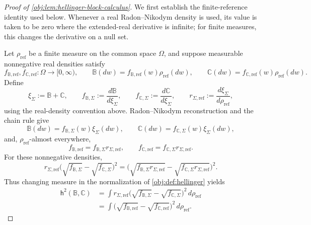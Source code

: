 \documentclass[11pt]{article}
\begin{document}
\begin{proof}[Proof of \cref{obj:lem:hellinger-block-calculus}]
We first establish the finite-reference identity used below. Whenever a real Radon--Nikodym density is used, its value is taken to be zero where the extended-real derivative is infinite; for finite measures, this changes the derivative on a null set.

Let \(\rho_{\mathrm{ref}}\) be a finite measure on the common space \(\Omega\), and suppose measurable nonnegative real densities satisfy
\[
f_{\mathbb B,\mathrm{ref}},f_{\mathbb C,\mathrm{ref}}
   :\Omega\longrightarrow[0,\infty),
\qquad
\mathbb B(dw)=f_{\mathbb B,\mathrm{ref}}(w)\rho_{\mathrm{ref}}(dw),
\qquad
\mathbb C(dw)=f_{\mathbb C,\mathrm{ref}}(w)\rho_{\mathrm{ref}}(dw).
\]
Define
\[
\xi_{\Sigma}:=\mathbb B+\mathbb C,
\qquad
f_{\mathbb B,\Sigma}:=\frac{d\mathbb B}{d\xi_{\Sigma}},
\qquad
f_{\mathbb C,\Sigma}:=\frac{d\mathbb C}{d\xi_{\Sigma}},
\qquad
r_{\Sigma,\mathrm{ref}}:=\frac{d\xi_{\Sigma}}{d\rho_{\mathrm{ref}}},
\]
using the real-density convention above. Radon--Nikodym reconstruction and the chain rule give
\[
\mathbb B(dw)=f_{\mathbb B,\Sigma}(w)\xi_{\Sigma}(dw),
\qquad
\mathbb C(dw)=f_{\mathbb C,\Sigma}(w)\xi_{\Sigma}(dw),
\]
and, \(\rho_{\mathrm{ref}}\)-almost everywhere,
\[
f_{\mathbb B,\mathrm{ref}}
   =f_{\mathbb B,\Sigma}r_{\Sigma,\mathrm{ref}},
\qquad
f_{\mathbb C,\mathrm{ref}}
   =f_{\mathbb C,\Sigma}r_{\Sigma,\mathrm{ref}}.
\]
For these nonnegative densities,
\[
r_{\Sigma,\mathrm{ref}}
 \bigl(\sqrt{f_{\mathbb B,\Sigma}}
             -\sqrt{f_{\mathbb C,\Sigma}}\bigr)^2
=
\bigl(\sqrt{f_{\mathbb B,\Sigma}r_{\Sigma,\mathrm{ref}}}
             -\sqrt{f_{\mathbb C,\Sigma}r_{\Sigma,\mathrm{ref}}}\bigr)^2.
\]
Thus changing measure in the normalization of \cref{obj:def:hellinger} yields
\[
\begin{aligned}
\mathsf h^2(\mathbb B,\mathbb C)
&=\int
 r_{\Sigma,\mathrm{ref}}
 \bigl(\sqrt{f_{\mathbb B,\Sigma}}
             -\sqrt{f_{\mathbb C,\Sigma}}\bigr)^2
 \,d\rho_{\mathrm{ref}}\\
&=\int
 \bigl(\sqrt{f_{\mathbb B,\mathrm{ref}}}
             -\sqrt{f_{\mathbb C,\mathrm{ref}}}\bigr)^2
 \,d\rho_{\mathrm{ref}}.
\end{aligned}
\]


\end{proof}
\end{document}
